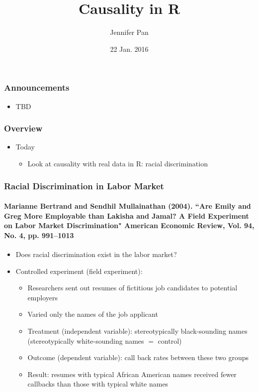 \documentclass{beamer}
\title[COMM 106/206]{Causality in R}
\subtitle{\black{Communication Research Methods}} %
\author[Jennifer Pan]{Jennifer Pan}
\institute[Stanford]{Assistant Professor\\
  Department of Communication\\
  Stanford University
  \mbox{ }\\
  \mbox{ }\\
  \mbox{ }\\
  \mbox{ }\\
  \mbox{ }\\
  \mbox{ }\\
  \mbox{ }\\
  \mbox{ }\\
  \mbox{ }\\
  {January 22, 2016}}
\date{}
\begin{document}
\frame{\titlepage}
\date{22 Jan. 2016}

\begin{frame}
 \frametitle<+->{Announcements}
 \begin{itemize}[<+->]
   \item TBD
 \end{itemize}
\end{frame}

\begin{frame}
 \frametitle<+->{Overview}
 \begin{itemize}[<+->]
   \item Today
     \begin{itemize}
       \item Look at causality with real data in R: racial discrimination
     \end{itemize}
 \end{itemize}
\end{frame}

\begin{frame}
 \frametitle<+->{Racial Discrimination in Labor Market}
 \framesubtitle<+->{Marianne Bertrand and Sendhil Mullainathan (2004). ``Are Emily and Greg More Employable than Lakisha and Jamal? A Field Experiment on Labor Market Discrimination" American Economic Review, Vol. 94, No. 4, pp. 991–1013}
 \begin{itemize}[<+->]
   \item Does racial discrimination exist in the labor market?
   \item Controlled experiment (field experiment):
     \begin{itemize}
       \item Researchers sent out resumes of fictitious job candidates to potential employers
       \item Varied only the names of the job applicant
       \item Treatment (independent variable): stereotypically black-sounding names (stereotypically white-sounding names $=$ control)
       \item Outcome (dependent variable): call back rates between these two groups
       \item Result: resumes with typical African American names received fewer callbacks than those with typical white names
     \end{itemize}
 \end{itemize}
\end{frame}
\end{document}
